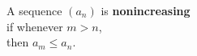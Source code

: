 \documentclass[border=6pt]{standalone}
\begin{document}
\parbox{2in}{A sequence $(a_n)$ is \textbf{nonincreasing} \\
  \null\quad if whenever $m > n$, \\
  \null\quad\quad then $a_m \leq a_n$.}
\end{document}
